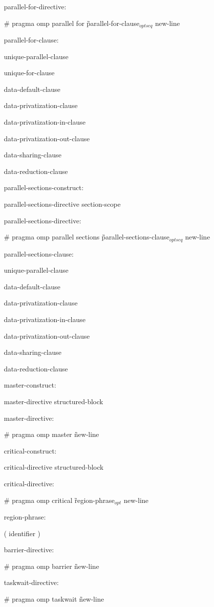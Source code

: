 {parallel-for-directive:

\C\I \# pragma omp parallel for \G parallel-for-clause$_{optseq}$ new-line

parallel-for-clause:

\I unique-parallel-clause

\I unique-for-clause

\I data-default-clause 

\I data-privatization-clause 

\I data-privatization-in-clause

\I data-privatization-out-clause 

\I data-sharing-clause 

\I data-reduction-clause 

parallel-sections-construct:

\I parallel-sections-directive section-scope

 parallel-sections-directive:

\C\I \# pragma omp parallel sections \G parallel-sections-clause$_{optseq}$ new-line

parallel-sections-clause:

\I unique-parallel-clause

\I data-default-clause 

\I data-privatization-clause 

\I data-privatization-in-clause

\I data-privatization-out-clause 

\I data-sharing-clause 

\I data-reduction-clause 

master-construct:

\I master-directive structured-block

master-directive:

\C\I \# pragma omp master \G new-line

critical-construct:

\I critical-directive structured-block

critical-directive:

\C\I \# pragma omp critical \G region-phrase$_{opt}$ new-line

region-phrase:

\I ( identifier )

barrier-directive:

\C\I \# pragma omp barrier \G new-line

taskwait-directive:

\C\I \# pragma omp taskwait \G new-line

}
